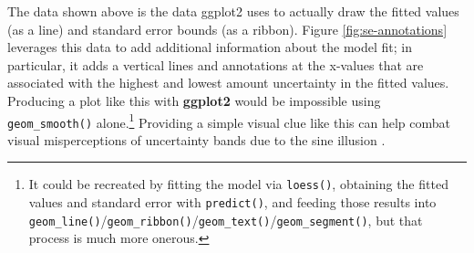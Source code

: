 \documentclass[
  12pt,
]{krantz}
\newenvironment{Shaded}{\begin{snugshade}}{\end{snugshade}}
\newcommand{\CommentTok}[1]{\textcolor[rgb]{0.56,0.35,0.01}{\textit{#1}}}
\newcommand{\DataTypeTok}[1]{\textcolor[rgb]{0.13,0.29,0.53}{#1}}
\newcommand{\DecValTok}[1]{\textcolor[rgb]{0.00,0.00,0.81}{#1}}
\newcommand{\KeywordTok}[1]{\textcolor[rgb]{0.13,0.29,0.53}{\textbf{#1}}}
\newcommand{\NormalTok}[1]{#1}
\newcommand{\OperatorTok}[1]{\textcolor[rgb]{0.81,0.36,0.00}{\textbf{#1}}}
\newcommand{\OtherTok}[1]{\textcolor[rgb]{0.56,0.35,0.01}{#1}}
\newcommand{\StringTok}[1]{\textcolor[rgb]{0.31,0.60,0.02}{#1}}
\begin{document}
\begin{Shaded}
\end{Shaded}

The data shown above is the data ggplot2 uses to actually draw the fitted values (as a line) and standard error bounds (as a ribbon). Figure \ref{fig:se-annotations} leverages this data to add additional information about the model fit; in particular, it adds a vertical lines and annotations at the x-values that are associated with the highest and lowest amount uncertainty in the fitted values. Producing a plot like this with \textbf{ggplot2} would be impossible using \texttt{geom\_smooth()} alone.\footnote{It could be recreated by fitting the model via \texttt{loess()}, obtaining the fitted values and standard error with \texttt{predict()}, and feeding those results into \texttt{geom\_line()}/\texttt{geom\_ribbon()}/\texttt{geom\_text()}/\texttt{geom\_segment()}, but that process is much more onerous.} Providing a simple visual clue like this can help combat visual misperceptions of uncertainty bands due to the sine illusion \citep{sine-illusion}.

\end{document}
